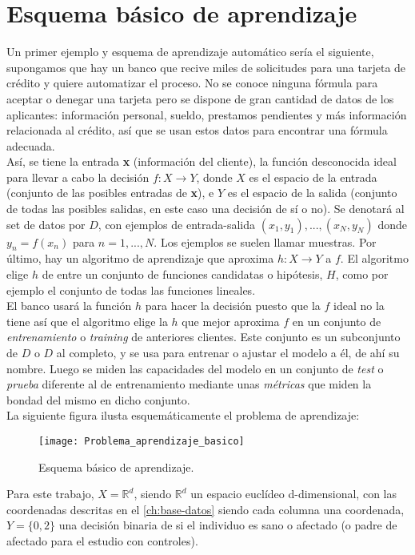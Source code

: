 \section{Esquema básico de aprendizaje}\label{st:basic}
Un primer ejemplo y esquema de aprendizaje automático sería el siguiente, supongamos que hay un banco que recive miles de solicitudes para una tarjeta de crédito y quiere automatizar el proceso. No se conoce ninguna fórmula para aceptar o denegar una tarjeta pero se dispone de gran cantidad de datos de los aplicantes: información personal, sueldo, prestamos pendientes y más información relacionada al crédito, así que se usan estos datos para encontrar una fórmula adecuada.\\
Así, se tiene la entrada \textbf{x} (información del cliente), la función desconocida ideal para llevar a cabo la decisión $f:X \rightarrow Y$, donde $X$ es el espacio de la entrada (conjunto de las posibles entradas de \textbf{x}), e $Y$ es el espacio de la salida (conjunto de todas las posibles salidas, en este caso una decisión de sí o no). Se denotará al set de datos por $D$, con ejemplos de entrada-salida $(x_{1},y_{1}),...,(x_{N},y_{N})$ donde $y_{n}=f(x_{n})$ para $n=1,...,N$. Los ejemplos se suelen llamar muestras. Por último, hay un algoritmo de aprendizaje que aproxima $h:X \rightarrow Y$ a $f$.  El algoritmo elige $h$ de entre un conjunto de funciones candidatas o hipótesis, $H$, como por ejemplo el conjunto de todas las funciones lineales.\\
El banco usará la función $h$ para hacer la decisión puesto que la $f$ ideal no la tiene así que el algoritmo elige la $h$ que mejor aproxima $f$ en un conjunto de \textit{entrenamiento} o \textit{training} de anteriores clientes. \cite{abu2012learning} Este conjunto es un subconjunto de $D$ o $D$ al completo, y se usa para entrenar o ajustar el modelo a él, de ahí su nombre. Luego se miden las capacidades del modelo en un conjunto de \textit{test} o \textit{prueba} diferente al de entrenamiento mediante unas \textit{métricas} que miden la bondad del mismo en dicho conjunto.\\
La siguiente figura ilusta esquemáticamente el problema de aprendizaje:
\begin{figure}[H]
  \centering
  \texttt{[image: Problema\_aprendizaje\_basico]}
  \caption{Esquema básico de aprendizaje. \cite{abu2012learning}}
  \label{fig:k-nn-example}
\end{figure}

Para este trabajo, $X=\mathbb{R}^{d}$, siendo $\mathbb{R}^{d}$ un espacio euclídeo d-dimensional, con las coordenadas descritas en el \autoref{ch:base-datos} siendo cada columna una coordenada, $Y=\lbrace 0,2 \rbrace$ una decisión binaria de si el individuo es sano o afectado (o padre de afectado para el estudio con controles).\\

